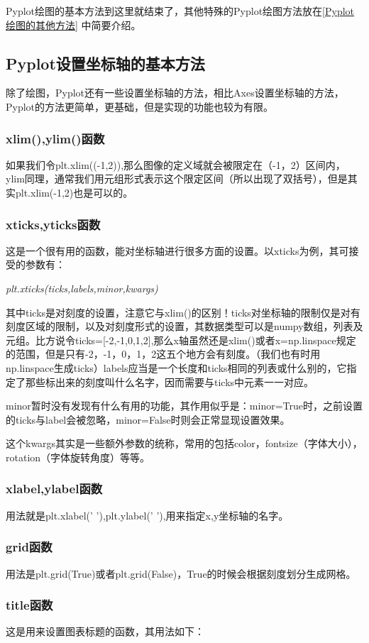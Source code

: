 \documentclass[12pt]{article}
\begin{document}
Pyplot绘图的基本方法到这里就结束了，其他特殊的Pyplot绘图方法放在\ref{Pyplot绘图的其他方法} 中简要介绍。
\subsection{Pyplot设置坐标轴的基本方法}
除了绘图，Pyplot还有一些设置坐标轴的方法，相比Axes设置坐标轴的方法，Pyplot的方法更简单，更基础，但是实现的功能也较为有限。
\subsubsection{xlim(),ylim()函数}
如果我们令plt.xlim((-1,2)),那么图像的定义域就会被限定在（-1，2）区间内，ylim同理，通常我们用元组形式表示这个限定区间（所以出现了双括号），但是其实plt.xlim(-1,2)也是可以的。
\subsubsection{xticks,yticks函数}
这是一个很有用的函数，能对坐标轴进行很多方面的设置。以xticks为例，其可接受的参数有：

\textit{\large plt.xticks(ticks,labels,minor,kwargs)}


其中ticks是对刻度的设置，注意它与xlim()的区别！ticks对坐标轴的限制仅是对有刻度区域的限制，以及对刻度形式的设置，其数据类型可以是numpy数组，列表及元组。比方说令ticks=[-2,-1,0,1,2],那么x轴虽然还是xlim()或者x=np.linspace规定的范围，但是只有-2，-1，0，1，2这五个地方会有刻度。（我们也有时用np.linspace生成ticks）labels应当是一个长度和ticks相同的列表或什么别的，它指定了那些标出来的刻度叫什么名字，因而需要与ticks中元素一一对应。

minor暂时没有发现有什么有用的功能，其作用似乎是：minor=True时，之前设置的ticks与label会被忽略，minor=False时则会正常显现设置效果。

这个kwargs其实是一些额外参数的统称，常用的包括color，fontsize（字体大小），rotation（字体旋转角度）等等。
 
\subsubsection{xlabel,ylabel函数}
用法就是plt.xlabel(' '),plt.ylabel(' '),用来指定x,y坐标轴的名字。

\subsubsection{grid函数}
用法是plt.grid(True)或者plt.grid(False)，True的时候会根据刻度划分生成网格。

\subsubsection{title函数}\label{title函数}
这是用来设置图表标题的函数，其用法如下：
\end{document}
